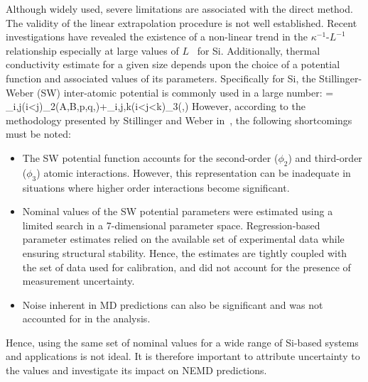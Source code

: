 Although widely used, severe limitations are associated with the direct method.
The validity of the linear extrapolation procedure is not well established. Recent
investigations have revealed the existence of a non-linear trend in the $\kappa^{-1}$-$L^{-1}$
relationship especially at large values of $L$~\cite{Sellan:2010} for Si. Additionally, 
thermal conductivity estimate for a given size depends upon the choice of a potential
function and associated values of its parameters. Specifically for Si, the Stillinger-Weber (SW)
inter-atomic potential is commonly used in a large number:
%
\be
\Phi = \sum\limits_{i,j(i<j)}\phi_2(A,B,p,q,\alpha)\hspace{1mm}+\sum\limits_{i,j,k(i<j<k)}\phi_3(\lambda,\gamma)
\ee
%
However, according
to the methodology presented by Stillinger and Weber in~\cite{Stillinger:1985},
the following shortcomings must be noted:
%
\begin{itemize}
\item The SW potential function accounts for the second-order ($\phi_2$) and
third-order ($\phi_3$) atomic 
interactions. However, this representation can be inadequate in situations where 
higher order interactions become significant.  
\item Nominal values of the SW potential parameters were estimated using a 
limited search in a 7-dimensional parameter space. Regression-based parameter
estimates relied on the available set of experimental data while ensuring structural
stability. Hence, the estimates are tightly coupled with the set of data used for
calibration, and did not account for the presence of measurement uncertainty. 
\item Noise inherent in MD predictions can also be significant and
was not accounted for in the analysis. 
\end{itemize}
%
Hence, using the same set of nominal values for a wide range of Si-based systems and
applications is not ideal. It is therefore important to attribute uncertainty to the values and
investigate its impact on NEMD predictions. 

